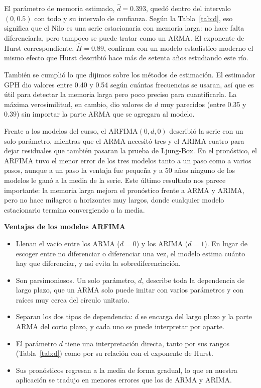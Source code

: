 \documentclass[legalpaper,11pt]{article}
\begin{document}
\begin{enumerate}
El par\'ametro de memoria estimado, $\hat d = 0.393$, qued\'o dentro del intervalo $(0, 0.5)$ con todo y su intervalo de confianza. Seg\'un la Tabla~\ref{tab:d}, eso significa que el Nilo es una serie estacionaria con memoria larga: no hace falta diferenciarla, pero tampoco se puede tratar como un ARMA. El exponente de Hurst correspondiente, $\hat H = 0.89$, confirma con un modelo estad\'istico moderno el mismo efecto que Hurst describi\'o hace m\'as de setenta a\~nos estudiando este r\'io.

Tambi\'en se cumpli\'o lo que dijimos sobre los m\'etodos de estimaci\'on. El estimador GPH dio valores entre 0.40 y 0.54 seg\'un cu\'antas frecuencias se usaran, as\'i que es \'util para detectar la memoria larga pero poco preciso para cuantificarla. La m\'axima verosimilitud, en cambio, dio valores de $d$ muy parecidos (entre 0.35 y 0.39) sin importar la parte ARMA que se agregara al modelo.

Frente a los modelos del curso, el ARFIMA$(0,d,0)$ describi\'o la serie con un solo par\'ametro, mientras que el ARMA necesit\'o tres y el ARIMA cuatro para dejar residuales que tambi\'en pasaran la prueba de Ljung-Box. En el pron\'ostico, el ARFIMA tuvo el menor error de los tres modelos tanto a un paso como a varios pasos, aunque a un paso la ventaja fue peque\~na y a 50 a\~nos ninguno de los modelos le gan\'o a la media de la serie. Este \'ultimo resultado nos parece importante: la memoria larga mejora el pron\'ostico frente a ARMA y ARIMA, pero no hace milagros a horizontes muy largos, donde cualquier modelo estacionario termina convergiendo a la media.

\medskip
\noindent\textbf{Ventajas de los modelos ARFIMA}
\begin{itemize}
\item Llenan el vac\'io entre los ARMA ($d = 0$) y los ARIMA ($d = 1$). En lugar de escoger entre no diferenciar o diferenciar una vez, el modelo estima cu\'anto hay que diferenciar, y as\'i evita la sobrediferenciaci\'on.
\item Son parsimoniosos. Un solo par\'ametro, $d$, describe toda la dependencia de largo plazo, que un ARMA solo puede imitar con varios par\'ametros y con ra\'ices muy cerca del c\'irculo unitario.
\item Separan los dos tipos de dependencia: $d$ se encarga del largo plazo y la parte ARMA del corto plazo, y cada uno se puede interpretar por aparte.
\item El par\'ametro $d$ tiene una interpretaci\'on directa, tanto por sus rangos (Tabla~\ref{tab:d}) como por su relaci\'on con el exponente de Hurst.
\item Sus pron\'osticos regresan a la media de forma gradual, lo que en nuestra aplicaci\'on se tradujo en menores errores que los de ARMA y ARIMA.
\end{itemize}


\end{enumerate}
\end{document}
